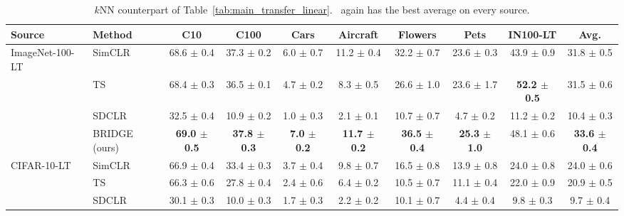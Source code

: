 \begin{table}[t]
\centering
\tiny
\setlength{\tabcolsep}{2.6pt}
\renewcommand{\arraystretch}{0.9}
\caption{$k$NN counterpart of Table~\ref{tab:main_transfer_linear}. \method\ again has the best average on every source.}
\label{tab:main_transfer_knn}
\begin{adjustbox}{max width=\textwidth}
\begin{tabular}{l l c c c c c c c c}
\toprule
Source & Method & C10 & C100 & Cars & Aircraft & Flowers & Pets & IN100-LT & Avg. \\
\midrule
ImageNet-100-LT & SimCLR & 68.6 {\scriptsize$\pm$ 0.4} & 37.3 {\scriptsize$\pm$ 0.2} & 6.0 {\scriptsize$\pm$ 0.7} & 11.2 {\scriptsize$\pm$ 0.4} & 32.2 {\scriptsize$\pm$ 0.7} & 23.6 {\scriptsize$\pm$ 0.3} & 43.9 {\scriptsize$\pm$ 0.9} & 31.8 {\scriptsize$\pm$ 0.5} \\
 & TS & 68.4 {\scriptsize$\pm$ 0.3} & 36.5 {\scriptsize$\pm$ 0.1} & 4.7 {\scriptsize$\pm$ 0.2} & 8.3 {\scriptsize$\pm$ 0.5} & 26.6 {\scriptsize$\pm$ 1.0} & 23.6 {\scriptsize$\pm$ 1.7} & \textbf{52.2 {\scriptsize$\pm$ 0.5}} & 31.5 {\scriptsize$\pm$ 0.6} \\
 & SDCLR & 32.5 {\scriptsize$\pm$ 0.4} & 10.9 {\scriptsize$\pm$ 0.2} & 1.0 {\scriptsize$\pm$ 0.3} & 2.1 {\scriptsize$\pm$ 0.1} & 10.7 {\scriptsize$\pm$ 0.7} & 4.7 {\scriptsize$\pm$ 0.2} & 11.2 {\scriptsize$\pm$ 0.2} & 10.4 {\scriptsize$\pm$ 0.3} \\
\rowcolor{blue!10} & BRIDGE (ours) & \textbf{69.0 {\scriptsize$\pm$ 0.5}} & \textbf{37.8 {\scriptsize$\pm$ 0.3}} & \textbf{7.0 {\scriptsize$\pm$ 0.2}} & \textbf{11.7 {\scriptsize$\pm$ 0.2}} & \textbf{36.5 {\scriptsize$\pm$ 0.4}} & \textbf{25.3 {\scriptsize$\pm$ 1.0}} & 48.1 {\scriptsize$\pm$ 0.6} & \textbf{33.6 {\scriptsize$\pm$ 0.4}} \\
\midrule
CIFAR-10-LT & SimCLR & 66.9 {\scriptsize$\pm$ 0.4} & 33.4 {\scriptsize$\pm$ 0.3} & 3.7 {\scriptsize$\pm$ 0.4} & 9.8 {\scriptsize$\pm$ 0.7} & 16.5 {\scriptsize$\pm$ 0.8} & 13.9 {\scriptsize$\pm$ 0.8} & 24.0 {\scriptsize$\pm$ 0.8} & 24.0 {\scriptsize$\pm$ 0.6} \\
 & TS & 66.3 {\scriptsize$\pm$ 0.6} & 27.8 {\scriptsize$\pm$ 0.4} & 2.4 {\scriptsize$\pm$ 0.6} & 6.4 {\scriptsize$\pm$ 0.2} & 10.5 {\scriptsize$\pm$ 0.7} & 11.1 {\scriptsize$\pm$ 0.4} & 22.0 {\scriptsize$\pm$ 0.9} & 20.9 {\scriptsize$\pm$ 0.5} \\
 & SDCLR & 30.1 {\scriptsize$\pm$ 0.3} & 10.0 {\scriptsize$\pm$ 0.3} & 1.7 {\scriptsize$\pm$ 0.3} & 2.2 {\scriptsize$\pm$ 0.2} & 10.1 {\scriptsize$\pm$ 0.7} & 4.4 {\scriptsize$\pm$ 0.4} & 9.8 {\scriptsize$\pm$ 0.3} & 9.7 {\scriptsize$\pm$ 0.4} \\

\end{tabular}
\end{adjustbox}
\end{table}
